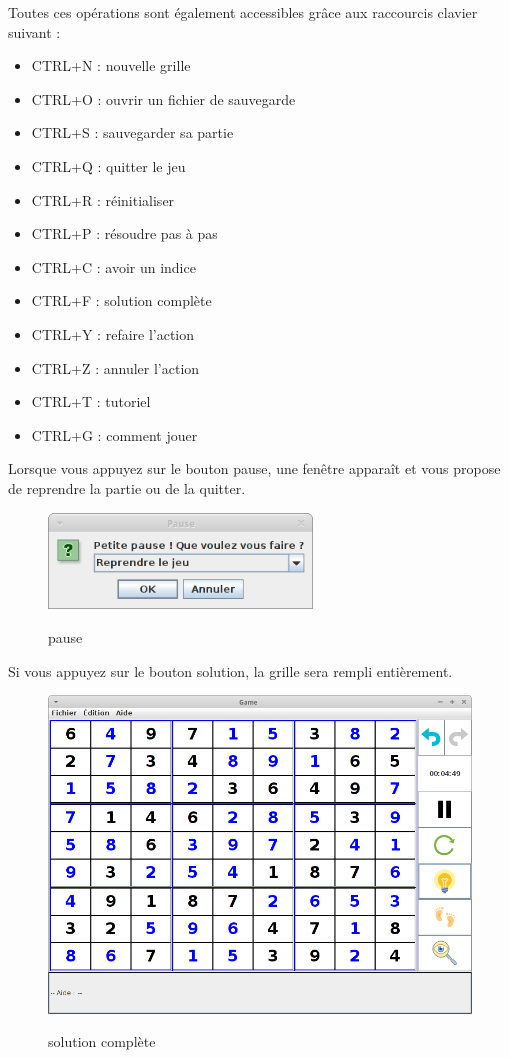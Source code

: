 \newpage
Toutes ces opérations sont également accessibles grâce aux raccourcis clavier suivant :
\begin{itemize}
 \item CTRL+N : nouvelle grille
 \item CTRL+O : ouvrir un fichier de sauvegarde
 \item CTRL+S : sauvegarder sa partie
 \item CTRL+Q : quitter le jeu
 \item CTRL+R : réinitialiser
 \item CTRL+P : résoudre pas à pas
 \item CTRL+C : avoir un indice
 \item CTRL+F : solution complète
 \item CTRL+Y : refaire l'action
 \item CTRL+Z : annuler l'action
 \item CTRL+T : tutoriel
 \item CTRL+G : comment jouer
\end{itemize}

\newpage
Lorsque vous appuyez sur le bouton pause, une fenêtre apparaît 
et vous propose de reprendre la partie ou de la quitter.
\begin{figure}[ht]
  \caption{\label{annexe10} pause}
  \includegraphics [width=70mm]{images/pause.png} \\[0.5cm]
\end{figure}

\newpage
Si vous appuyez sur le bouton solution, la grille sera rempli entièrement.
\begin{figure}[ht]
  \caption{\label{annexe11} solution complète}
  \includegraphics [width=130mm]{images/solution.png} \\[0.5cm]
\end{figure}

